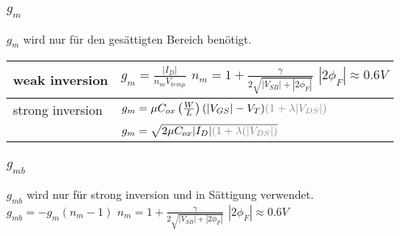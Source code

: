 \subsubsection{$g_m$}
$g_m$ wird nur für den gesättigten Bereich benötigt.\\
\begin{tabular}{|l|l|}
    \hline
    weak inversion & $g_m = \frac{|I_D|}{n_m V_{temp}}$ \qquad $n_m = 1+\frac{\gamma}{2\sqrt{|V_{SB}|+|2\phi_F|}}$ \quad $|2\phi_F| \approx 0.6V$\\
    \hline
    strong inversion & $g_m = \mu C_{ox} \left(\frac W L\right) (|V_{GS}| - V_T)\color{gray} (1 + \lambda |V_{DS}|)$\\
    & $g_m = \sqrt{2 \mu C_{ox} |I_D| \color{gray} (1+\lambda(|V_{DS}|)}$\\
    \hline
\end{tabular}

\subsubsection{$g_{mb}$}
$g_{mb}$ wird nur für strong inversion und in Sättigung verwendet.\\
$g_{mb} = -g_m(n_m - 1)$ \qquad $n_m = 1+\frac{\gamma}{2\sqrt{|V_{SB}|+|2\phi_F|}}$ \quad $|2\phi_F| \approx 0.6V$


